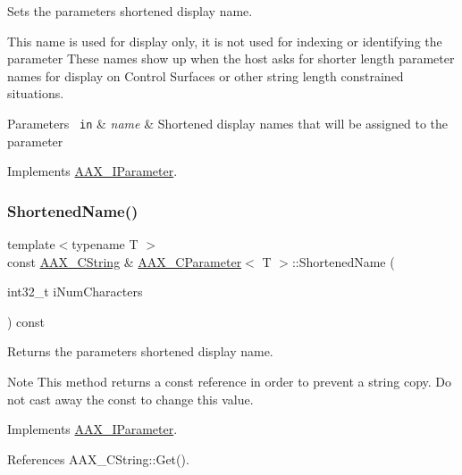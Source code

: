 Sets the parameter\textquotesingle{}s shortened display name. 

This name is used for display only, it is not used for indexing or identifying the parameter These names show up when the host asks for shorter length parameter names for display on Control Surfaces or other string length constrained situations.


\begin{DoxyParams}[1]{Parameters}
\mbox{\texttt{ in}}  & {\em name} & Shortened display names that will be assigned to the parameter \\
\hline
\end{DoxyParams}


Implements \mbox{\hyperlink{a01857_a642ce0054e136c75fe402ebd53a4eb90}{A\+A\+X\+\_\+\+I\+Parameter}}.

\mbox{\label{a01537_a3a804fb1ba33f9b748294bc868915813}} 
\subsubsection{\texorpdfstring{ShortenedName()}{ShortenedName()}}
{\footnotesize\ttfamily template$<$typename T $>$ \\
const \mbox{\hyperlink{a01573}{A\+A\+X\+\_\+\+C\+String}} \& \mbox{\hyperlink{a01537}{A\+A\+X\+\_\+\+C\+Parameter}}$<$ T $>$\+::Shortened\+Name (\begin{DoxyParamCaption}\item[{int32\+\_\+t}]{i\+Num\+Characters }\end{DoxyParamCaption}) const\hspace{0.3cm}{\ttfamily [virtual]}}



Returns the parameter\textquotesingle{}s shortened display name. 

\begin{DoxyNote}{Note}
This method returns a const reference in order to prevent a string copy. Do not cast away the const to change this value. 
\end{DoxyNote}


Implements \mbox{\hyperlink{a01857_a729ead00bf12103793557f39a01f782c}{A\+A\+X\+\_\+\+I\+Parameter}}.



References A\+A\+X\+\_\+\+C\+String\+::\+Get().

